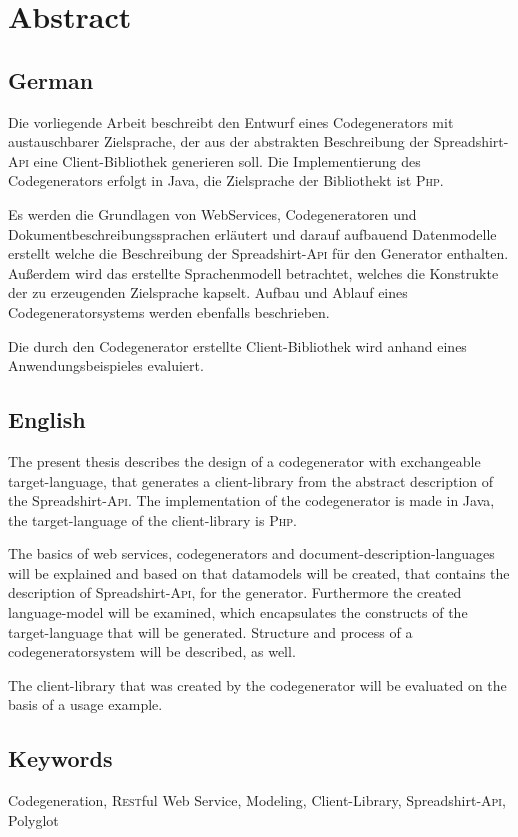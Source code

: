 \chapter*{Abstract}



\section*{German}

Die vorliegende Arbeit beschreibt den Entwurf eines Codegenerators mit austauschbarer Zielsprache, der aus der abstrakten Beschreibung der Spreadshirt-\textsc{Api} eine Client-Bibliothek generieren soll. Die Implementierung des Codegenerators erfolgt in Java, die Zielsprache der Bibliothekt ist \textsc{Php}. 

Es werden die Grundlagen von WebServices, Codegeneratoren und Dokumentbeschreibungssprachen erläutert und darauf aufbauend Datenmodelle erstellt welche die Beschreibung der Spreadshirt-\textsc{Api} für den Generator enthalten. Außerdem wird das erstellte Sprachenmodell betrachtet, welches die Konstrukte der zu erzeugenden Zielsprache kapselt. Aufbau und Ablauf eines Codegeneratorsystems werden ebenfalls beschrieben.

Die durch den Codegenerator erstellte Client-Bibliothek wird anhand eines Anwendungsbeispieles evaluiert.

\section*{English}

The present thesis describes the design of a codegenerator with exchangeable target-language, that generates a client-library from the abstract description of the Spreadshirt-\textsc{Api}. The implementation of the codegenerator is made in Java, the target-language of the client-library is \textsc{Php}.

The basics of web services, codegenerators and document-description-languages will be explained and based on that datamodels will be created, that contains the description of Spreadshirt-\textsc{Api}, for the generator. Furthermore the created language-model will be examined, which encapsulates the constructs of the target-language that will be generated. Structure and process of a codegeneratorsystem will be described, as well.

The client-library that was created by the codegenerator will be evaluated on the basis of a usage example.

\section*{Keywords}

Codegeneration, \textsc{Rest}ful Web Service, Modeling, Client-Library, Spreadshirt-\textsc{Api}, Polyglot
\newpage